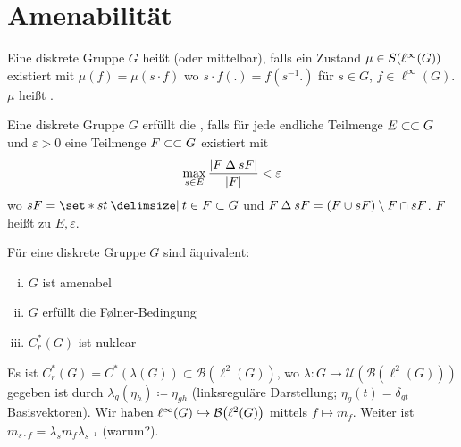 \newpage

\section{Amenabilität} %
\label{sec:5}

\begin{definition}[{name=[amenabel]{von Neumann}}]
	Eine diskrete Gruppe $G$ heißt  (oder mittelbar), falls ein Zustand $\mu \in S \enbrace*{\ell^\infty(G)}$ existiert mit $\mu(f) = \mu(s \cdot f)$ wo $s \cdot f(.) = f(s^{-1} .)$ für $s \in G$, $f \in \ell^\infty(G)$.
	$\mu$ heißt . 
\end{definition}

\begin{definition}[{name=[Følner-Bedingung]}]
	Eine diskrete Gruppe $G$ erfüllt die , falls für jede endliche Teilmenge $E \finSub G$ und $\varepsilon>0$ eine Teilmenge $F \finSub G$ existiert mit 
	\[
		\max_{s \in E} \frac{\abs*{F \DeltaOp sF} }{\abs*{F}} < \varepsilon  
	\]
	wo $sF = \set*{st \given t \in F} \subset G$ und $F \DeltaOp sF = (F \cup sF) \setminus F \cap sF$.
	$F$ heißt  zu $E,\varepsilon$.
\end{definition}

\begin{satz}[label=satz:53]
	Für eine diskrete Gruppe $G$ sind äquivalent:
	\begin{enumerate}[(i)]
		\item $G$ ist amenabel
		\item $G$ erfüllt die Følner-Bedingung
		\item $C^*_r(G)$ ist nuklear
	\end{enumerate}
\end{satz}

\begin{erinnerung}
	Es ist $C^*_r(G) = C^*(\lambda(G)) \subset \mathcal{B}(\ell^2(G))$, wo $\lambda \colon G \to \mathcal{U}(\mathcal{B}(\ell^2(G)))$ gegeben ist durch $\lambda_g(\eta_h) \coloneqq \eta_{gh}$ (linksreguläre Darstellung; $\eta_g(t)= \delta_{gt}$ Basisvektoren).
	Wir haben $\ell^\infty(G) \hookrightarrow \mathcal{B} \enbrace*{\ell^2(G)}$ mittels $f \mapsto m_f$.
	Weiter ist $m_{s \cdot f} = \lambda_s m_f \lambda_{s^{-1}}$ (warum?).
\end{erinnerung}

